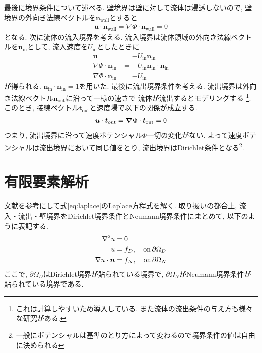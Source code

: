 \documentclass{ltjsarticle}
\begin{document}
最後に境界条件について述べる.
壁境界は壁に対して流体は浸透しないので, 
壁境界の外向き法線ベクトルを$\bm{n}_\mathrm{wall}$とすると
\begin{align}
    \bm{u}\cdot\bm{n}_\mathrm{wall} = \nabla\Phi\cdot\bm{n}_\mathrm{wall} =0
\end{align}
となる.
次に流体の流入境界を考える.
流入境界は流体領域の外向き法線ベクトルを$\bm{n}_\mathrm{in}$として, 流入速度を$U_\mathrm{in}$としたときに
\begin{align}
    \bm{u} &= -U_\mathrm{in}\bm{n}_\mathrm{in} \\  
    \nabla\Phi \cdot \bm{n}_\mathrm{in} &= -U_\mathrm{in}\bm{n}_\mathrm{in} \cdot \bm{n}_\mathrm{in} \\
    \nabla\Phi \cdot \bm{n}_\mathrm{in} &= -U_\mathrm{in}
\end{align}
が得られる. $\bm{n}_\mathrm{in} \cdot \bm{n}_\mathrm{in} =1$を用いた.
最後に流出境界条件を考える. 
流出境界は外向き法線ベクトル$\bm{n}_\mathrm{out}$に沿って一様の速さで
流体が流出するとモデリングする
\footnote{これは計算しやすいため導入している. また流体の流出条件の与え方も様々な研究がある.}.
このとき, 接線ベクトル$\bm{t}_\mathrm{out}$と速度場で以下の関係が成立する.
\begin{align}
    \bm{u}\cdot\bm{t}_\mathrm{out} =  \grad\Phi\cdot\bm{t}_\mathrm{out} =0
\end{align}
つまり, 流出境界に沿って速度ポテンシャル$\Phi$一切の変化がない.
よって速度ポテンシャルは流出境界において同じ値をとり, 
流出境界はDirichlet条件となる\footnote{一般にポテンシャルは基準のとり方によって変わるので境界条件の値は自由に決められる}.

\section{有限要素解析}
文献\cite{Larson2013}を参考にして式\eqref{eq:laplace}のLaplace方程式を解く.
取り扱いの都合上, 流入・流出・壁境界をDirichlet境界条件とNeumann境界条件にまとめて,
以下のように表記する.
\begin{align}
    \laplacian u &= 0 \label{eq:gov} \\
    u &= f_D,\quad \mathrm{on}\,\partial \Omega_D \label{eq:dirichlet_bc} \\
    \nabla u\cdot\bm{n} &= f_N,\quad \mathrm{on}\,\partial \Omega_N \label{eq:neumann_bc} 
\end{align}
ここで, $\partial\Omega_D$はDirichlet境界が貼られている境界で, 
$\partial\Omega_N$がNeumann境界条件が貼られている境界である.
\end{document}
